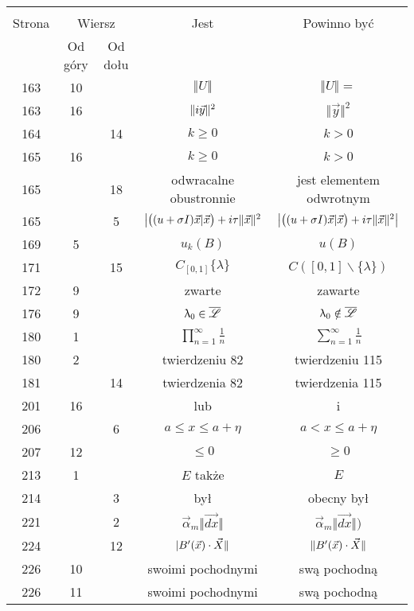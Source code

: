 \documentclass[a4paper,11pt]{article}
\begin{document}
\begin{center}

  \begin{tabular}{|c|c|c|c|c|}
    \hline
    & \multicolumn{2}{c|}{} & & \\
    Strona & \multicolumn{2}{c|}{Wiersz} & Jest
                              & Powinno być \\ \cline{2-3}
    & Od góry & Od dołu & & \\
    \hline
    163 & 10 & & $\Vert U \Vert$ & $\Vert U \Vert =$ \\
    163 & 16 & & $\Vert i\vec{ y } \Vert^{ 2 }$ & $\Vert \vec{ y } \Vert^{ 2 }$ \\
    164 & & 14 & $k \geq 0$ & $k > 0$ \\
    165 & 16 & & $k \geq 0$ & $k > 0$ \\
    165 & & 18 & odwracalne obustronnie & jest elementem odwrotnym \\
    165 & &  5 & $\big{ | } \big( ( u + \sigma I ) \vec{ x } |
                 \vec{ x } \big) + i \tau \Vert \vec{ x } \Vert^{ 2 }$
           & $\big{ | } \big( ( u + \sigma I ) \vec{ x } | \vec{ x } \big)
             + i \tau \Vert \vec{ x } \Vert^{ 2 } \big{ | }$ \\
    169 &  5 & & $u_{ k }( B )$ & $u( B )$ \\
    171 & & 15 & $C_{ [ 0, 1 ] } \{ \lambda \}$
           & $C( [ 0, 1 ] \backslash \{ \lambda \} )$ \\
    172 &  9 & & zwarte & zawarte \\
    176 &  9 & & $\uplambda_{ 0 } \in \overline{ \mathcal{L} }$
           & $\uplambda_{ 0 } \notin \overline{ \mathcal{L} }$ \\
    180 &  1 & & $\prod^{ \infty }_{ n = 1 } \frac{ 1 }{ n }$
           & $\sum^{ \infty }_{ n = 1 } \frac{ 1 }{ n }$ \\
    180 &  2 & & twierdzeniu 82 & twierdzeniu 115 \\
    181 & & 14 & twierdzenia 82 & twierdzenia 115 \\
    201 & 16 & & lub & i \\
    206 & &  6 & $a \leq x \leq a + \eta$ & $a < x \leq a + \eta$ \\
    207 & 12 & & $\leq 0$ & $\geq 0$ \\
    213 &  1 & & $E$ także & $E$ \\
    214 & &  3 & był & obecny był \\
    221 & &  2 & $\vec{ \alpha }_{ m } \Vert \overrightarrow{ dx } \Vert$
           & $\vec{ \alpha }_{ m } \Vert \overrightarrow{ dx } \Vert )$ \\
    224 & & 12 & $| B'( \vec{ x } ) \cdot \vec{ X } \Vert$
           & $\Vert B'( \vec{ x } ) \cdot \vec{ X } \Vert$ \\
    226 & 10 & & swoimi pochodnymi & swą pochodną \\
    226 & 11 & & swoimi pochodnymi & swą pochodną \\
    \hline
  \end{tabular}

\end{center}
\end{document}
